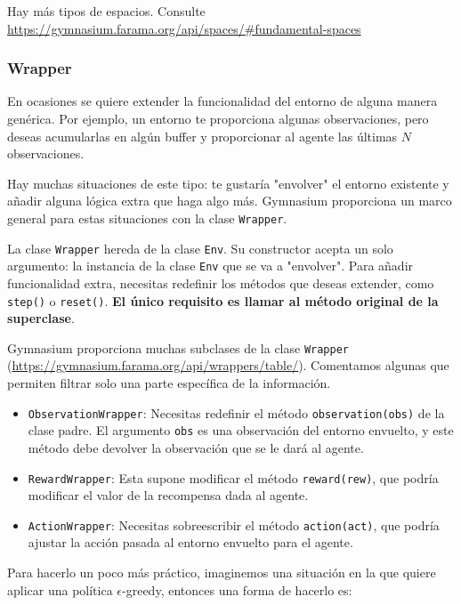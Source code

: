 \documentclass[a4paper, 11pt]{article}
\begin{document}
Hay más tipos de espacios. Consulte \url{https://gymnasium.farama.org/api/spaces/#fundamental-spaces}



\subsubsection*{Wrapper}


En ocasiones se quiere extender la funcionalidad del entorno de alguna manera genérica. Por ejemplo, un entorno te proporciona algunas observaciones, pero deseas acumularlas en algún buffer y proporcionar al agente las últimas \( N \) observaciones. 

Hay muchas  situaciones de este tipo: te gustaría "\/envolver" el entorno existente y añadir alguna lógica extra que haga algo más. Gymnasium  proporciona un marco general para estas situaciones con la clase \texttt{Wrapper}.

La clase \texttt{Wrapper} hereda de la clase \texttt{Env}. Su constructor acepta un solo argumento: la instancia de la clase \texttt{Env} que se va a "\/envolver". Para añadir funcionalidad extra, necesitas redefinir los métodos que deseas extender, como \texttt{step()} o \texttt{reset()}. \textbf{El único requisito es llamar al método original de la superclase}.


Gymnasium  proporciona muchas subclases de la clase \texttt{Wrapper} (\url{https://gymnasium.farama.org/api/wrappers/table/}). Comentamos algunas que permiten filtrar solo una parte específica de la información.


\begin{itemize}
    \item \texttt{ObservationWrapper}: Necesitas redefinir el método \texttt{observation(obs)} de la clase padre. El argumento \texttt{obs} es una observación del entorno envuelto, y este método debe devolver la observación que se le dará al agente.

    \item \texttt{RewardWrapper}: Esta supone modificar el método \texttt{reward(rew)}, que podría modificar el valor de la recompensa dada al agente.

    \item \texttt{ActionWrapper}: Necesitas sobreescribir el método \texttt{action(act)}, que podría ajustar la acción pasada al entorno envuelto para el agente.
\end{itemize}

Para hacerlo un poco más práctico, imaginemos una situación en la que quiere aplicar una política $\epsilon$-greedy, entonces una forma de hacerlo es:
\end{document}
